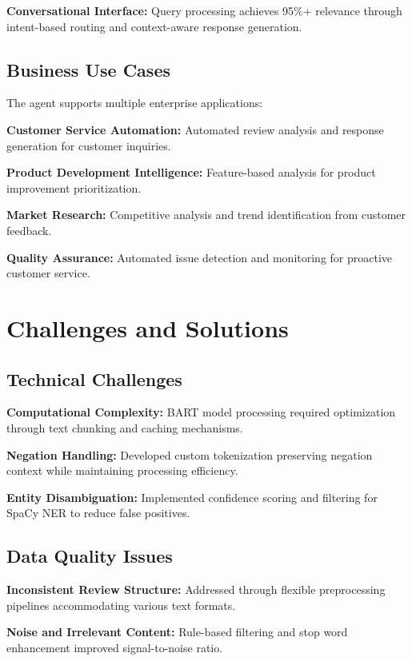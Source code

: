 \documentclass[11pt,a4paper]{article}
\begin{document}
\textbf{Conversational Interface:}
Query processing achieves 95\%+ relevance through intent-based routing and context-aware response generation.

\subsection{Business Use Cases}

The agent supports multiple enterprise applications:

\textbf{Customer Service Automation:} Automated review analysis and response generation for customer inquiries.

\textbf{Product Development Intelligence:} Feature-based analysis for product improvement prioritization.

\textbf{Market Research:} Competitive analysis and trend identification from customer feedback.

\textbf{Quality Assurance:} Automated issue detection and monitoring for proactive customer service.

\section{Challenges and Solutions}

\subsection{Technical Challenges}

\textbf{Computational Complexity:} BART model processing required optimization through text chunking and caching mechanisms.

\textbf{Negation Handling:} Developed custom tokenization preserving negation context while maintaining processing efficiency.

\textbf{Entity Disambiguation:} Implemented confidence scoring and filtering for SpaCy NER to reduce false positives.

\subsection{Data Quality Issues}

\textbf{Inconsistent Review Structure:} Addressed through flexible preprocessing pipelines accommodating various text formats.

\textbf{Noise and Irrelevant Content:} Rule-based filtering and stop word enhancement improved signal-to-noise ratio.
\end{document}
